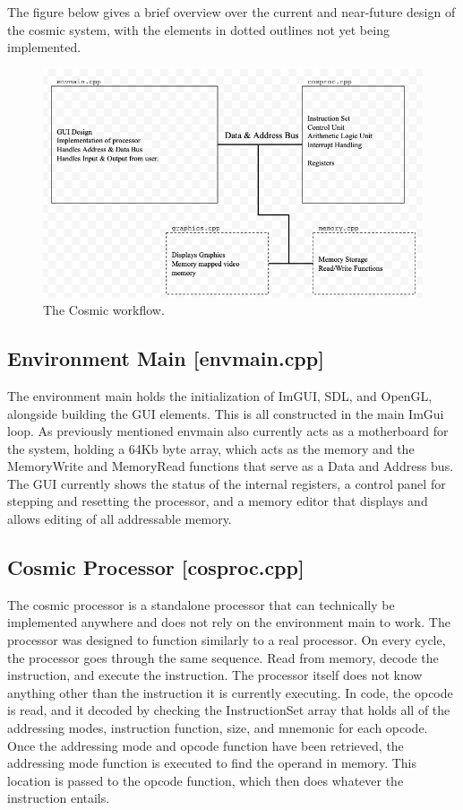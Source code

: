 \documentclass[conference]{IEEEtran}
\begin{document}
The figure below gives a brief overview over the current and near-future design of the cosmic system, with the elements in dotted outlines not yet being implemented.

\begin{figure}[h!]
	\includegraphics[width=\linewidth]{SystemDesign.png}
	\caption{The Cosmic workflow.}
	\label{fig:The Cosmic Workflow}
\end{figure}



\subsection{Environment Main [envmain.cpp]}

The environment main holds the initialization of ImGUI, SDL, and OpenGL, alongside building the GUI elements. This is all constructed in the main ImGui loop. As previously mentioned envmain also currently acts as a motherboard for the system, holding a 64Kb byte array, which acts as the memory and the MemoryWrite and MemoryRead functions that serve as a Data and Address bus. The GUI currently shows the status of the internal registers, a control panel for stepping and resetting the processor, and a memory editor that displays and allows editing of all addressable memory. 


\subsection{Cosmic Processor [cosproc.cpp]}

The cosmic processor is a standalone processor that can technically be implemented anywhere and does not rely on the environment main to work. The processor was designed to function similarly to a real processor. On every cycle, the processor goes through the same sequence. Read from memory, decode the instruction, and execute the instruction. The processor itself does not know anything other than the instruction it is currently executing. In code, the opcode is read, and it decoded by checking the InstructionSet array that holds all of the addressing modes, instruction function, size, and mnemonic for each opcode. Once the addressing mode and opcode function have been retrieved, the addressing mode function is executed to find the operand in memory. This location is passed to the opcode function, which then does whatever the instruction entails.
\end{document}
